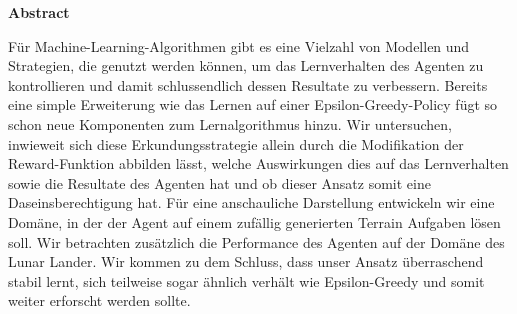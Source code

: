 %
%
\vspace*{2cm}

\begin{center}
    \textbf{Abstract}
\end{center}

\vspace*{1cm}


\noindent Für Machine-Learning-Algorithmen gibt es eine Vielzahl von Modellen und Strategien, die genutzt werden können, um das Lernverhalten des Agenten zu kontrollieren und damit schlussendlich dessen Resultate zu verbessern. Bereits eine simple Erweiterung wie das Lernen auf einer Epsilon-Greedy-Policy fügt so schon neue Komponenten zum Lernalgorithmus hinzu. Wir untersuchen, inwieweit sich diese Erkundungsstrategie allein durch die Modifikation der Reward-Funktion abbilden lässt, welche Auswirkungen dies auf das Lernverhalten sowie die Resultate des Agenten hat und ob dieser Ansatz somit eine Daseinsberechtigung hat. Für eine anschauliche Darstellung entwickeln wir eine Domäne, in der der Agent auf einem zufällig generierten Terrain Aufgaben lösen soll. Wir betrachten zusätzlich die Performance des Agenten auf der Domäne des Lunar Lander. Wir kommen zu dem Schluss, dass unser Ansatz überraschend stabil lernt, sich teilweise sogar ähnlich verhält wie Epsilon-Greedy und somit weiter erforscht werden sollte.

